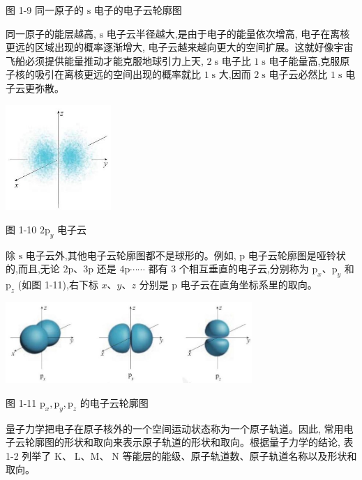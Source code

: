 \documentclass[10pt]{article}
\begin{document}
图 1-9 同一原子的 \(\mathrm{s}\) 电子的电子云轮廓图

同一原子的能层越高, \(\mathrm{s}\) 电子云半径越大,是由于电子的能量依次增高, 电子在离核更远的区域出现的概率逐渐增大, 电子云越来越向更大的空间扩展。这就好像宇宙飞船必须提供能量推动才能克服地球引力上天, \(2\mathrm{\;s}\) 电子比 \(1\mathrm{\;s}\) 电子能量高,克服原子核的吸引在离核更远的空间出现的概率就比 \(1\mathrm{\;s}\) 大,因而 \(2\mathrm{\;s}\) 电子云必然比 \(1\mathrm{\;s}\) 电子云更弥散。

\begin{center}
\includegraphics[max width=0.3\textwidth]{images/0190e026-5a11-7df7-bd27-54d09026ba7a_16_643274.jpg}
\end{center}

图 1-10 \(2{\mathrm{p}}_{y}\) 电子云

除 \(\mathrm{s}\) 电子云外,其他电子云轮廓图都不是球形的。例如, \(\mathrm{p}\) 电子云轮廓图是哑铃状的,而且,无论 \(2\mathrm{p}\text{、}3\mathrm{p}\) 还是 \(4\mathrm{p}\cdots \cdots\) 都有 3 个相互垂直的电子云,分别称为 \({\mathrm{p}}_{x}\text{、}{\mathrm{p}}_{y}\) 和 \({\mathrm{p}}_{z}\) (如图 1-11),右下标 \(x\text{、}y\text{、}z\) 分别是 \(\mathrm{p}\) 电子云在直角坐标系里的取向。

\begin{center}
\includegraphics[max width=0.7\textwidth]{images/0190e026-5a11-7df7-bd27-54d09026ba7a_16_750584.jpg}
\end{center}

图 1-11 \({\mathrm{p}}_{x},{\mathrm{p}}_{y},{\mathrm{p}}_{z}\) 的电子云轮廓图

量子力学把电子在原子核外的一个空间运动状态称为一个原子轨道。因此, 常用电子云轮廓图的形状和取向来表示原子轨道的形状和取向。根据量子力学的结论, 表 1-2 列举了 \(\mathrm{K}\text{、}\mathrm{\;L}\text{、}\mathrm{M}\text{、}\mathrm{\;N}\) 等能层的能级、原子轨道数、原子轨道名称以及形状和取向。
\end{document}
